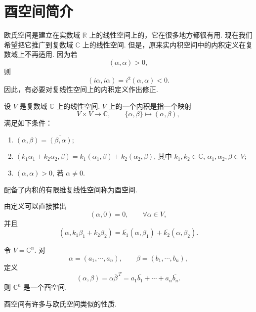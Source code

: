 \section{酉空间简介}

欧氏空间是建立在实数域 $\mathbb{R}$ 上的线性空间上的，它在很多地方都很有用.
现在我们希望把它推广到复数域 $\mathbb{C}$ 上的线性空间.
但是，原来实内积空间中的内积定义在复数域上不再适用. 因为若
\[
(\alpha,\alpha)>0,
\]
则
\[
(i\alpha,i\alpha)=i^2(\alpha,\alpha)<0.
\]
因此，有必要对复线性空间上的内积定义作出修正.

\begin{definition}\label{p1:concept:c6-l2464}
	设 $V$ 是复数域 $\mathbb{C}$ 上的线性空间. $V$ 上的一个内积是指一个映射
	\[
	V\times V\longrightarrow \mathbb{C},
	\qquad
	\{\alpha,\beta\}\longmapsto (\alpha,\beta),
	\]
	满足如下条件：
	\begin{enumerate}
		\item $(\alpha,\beta)=\overline{(\beta,\alpha)}$;
		\item $(k_1\alpha_1+k_2\alpha_2,\beta)
		=k_1(\alpha_1,\beta)+k_2(\alpha_2,\beta)$,
		其中 $k_1,k_2\in\mathbb{C}$, $\alpha_1,\alpha_2,\beta\in V$;
		\item $(\alpha,\alpha)>0$, 若 $\alpha\ne0$.
	\end{enumerate}
	配备了内积的有限维复线性空间称为酉空间.
\end{definition}

由定义可以直接推出
\[
(\alpha,0)=0,
\qquad
\forall \alpha\in V,
\]
并且
\[
(\alpha,k_1\beta_1+k_2\beta_2)
=\overline{k_1}(\alpha,\beta_1)+\overline{k_2}(\alpha,\beta_2).
\]

\begin{example}
	令 $V=\mathbb{C}^n$. 对
	\[
	\alpha=(a_1,\cdots,a_n),
	\qquad
	\beta=(b_1,\cdots,b_n),
	\]
	定义
	\[
	(\alpha,\beta)=\alpha\overline{\beta}^{\,T}
	=a_1\overline{b_1}+\cdots+a_n\overline{b_n}.
	\]
	则 $\mathbb{C}^n$ 是一个酉空间.
\end{example}

酉空间有许多与欧氏空间类似的性质.

